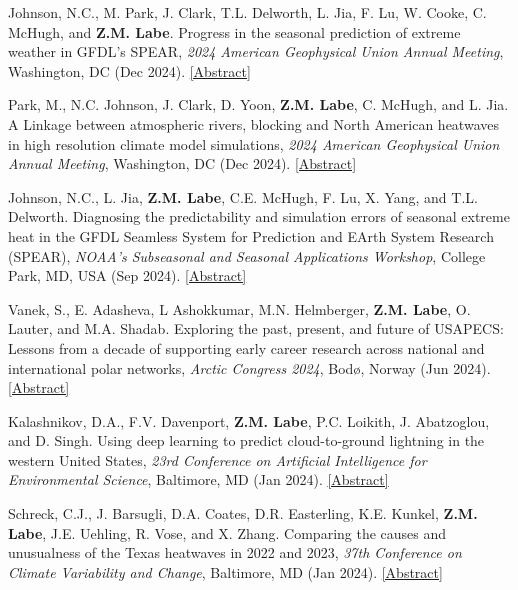 \documentclass[margin,line,palatino,courier,10pt]{res}
\begin{document}
\begin{resume}
\begin{etaremune}[leftmargin=0in,topsep=0in,parsep=0in]
\item Johnson, N.C., M. Park, J. Clark, T.L. Delworth, L. Jia, F. Lu, W. Cooke, C. McHugh, and \textbf{Z.M. Labe}. Progress in the seasonal prediction of extreme weather in GFDL’s SPEAR, \textit{2024 American Geophysical Union Annual Meeting}, Washington, DC (Dec 2024). \href{https://agu.confex.com/agu/agu24/meetingapp.cgi/Paper/1531073}{[Abstract]}
\item Park, M., N.C. Johnson, J. Clark, D. Yoon, \textbf{Z.M. Labe}, C. McHugh, and L. Jia. A Linkage between atmospheric rivers, blocking and North American heatwaves in high resolution climate model simulations, \textit{2024 American Geophysical Union Annual Meeting}, Washington, DC (Dec 2024). \href{https://agu.confex.com/agu/agu24/meetingapp.cgi/Paper/1543440}{[Abstract]}
\item Johnson, N.C., L. Jia, \textbf{Z.M. Labe}, C.E. McHugh, F. Lu, X. Yang, and T.L. Delworth. Diagnosing the predictability and simulation errors of seasonal extreme heat in the GFDL Seamless System for Prediction and EArth System Research (SPEAR), \textit{NOAA's Subseasonal and Seasonal Applications Workshop}, College Park, MD, USA (Sep 2024). \href{https://vlab.noaa.gov/documents/17693964/39260487/Johnson_Nathaniel_2024-s2s.pdf}{[Abstract]}
\item Vanek, S., E. Adasheva, L Ashokkumar, M.N. Helmberger, \textbf{Z.M. Labe}, O. Lauter, and M.A. Shadab. Exploring the past, present, and future of USAPECS: Lessons from a decade of supporting early career research across national and international polar networks, \textit{Arctic Congress 2024}, Bod\o, Norway (Jun 2024). \href{https://www.eventsforce.net/apriilcongress/frontend/reg/absViewDocumentFE.csp?popup=1&documentID=1310&eventID=57}{[Abstract]}
\item Kalashnikov, D.A., F.V. Davenport, \textbf{Z.M. Labe}, P.C. Loikith, J. Abatzoglou, and D. Singh. Using deep learning to predict cloud-to-ground lightning in the western United States, \textit{23rd Conference on Artificial Intelligence for Environmental Science}, Baltimore, MD (Jan 2024). \href{https://ams.confex.com/ams/104ANNUAL/meetingapp.cgi/Paper/431802}{[Abstract]}
\item Schreck, C.J., J. Barsugli, D.A. Coates, D.R. Easterling, K.E. Kunkel, \textbf{Z.M. Labe}, J.E. Uehling, R. Vose, and X. Zhang. Comparing the causes and unusualness of the Texas heatwaves in 2022 and 2023, \textit{37th Conference on Climate Variability and Change}, Baltimore, MD (Jan 2024). \href{https://ams.confex.com/ams/104ANNUAL/meetingapp.cgi/Paper/427912}{[Abstract]}

\end{etaremune}
\end{resume}
\end{document}
